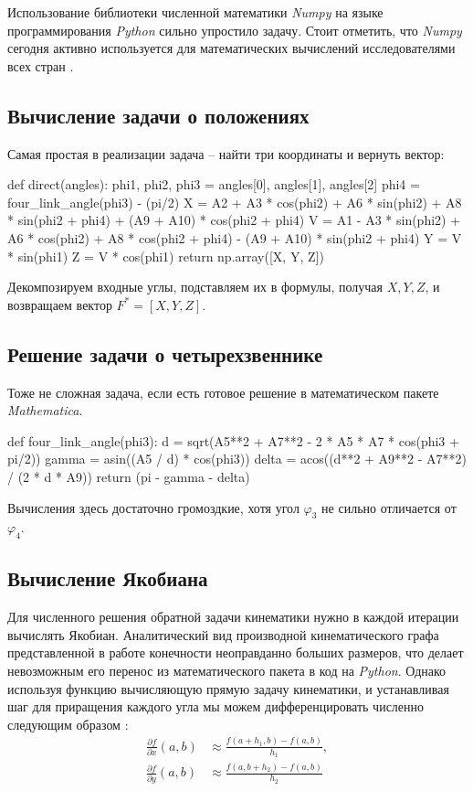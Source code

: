 Использование библиотеки численной математики \textit{Numpy} на языке программирования \textit{Python} сильно упростило задачу. Стоит отметить, что \textit{Numpy} сегодня активно используется для математических вычислений исследователями всех стран \cite{Numpy2020}.

\subsection{Вычисление задачи о положениях}

Самая простая в реализации задача -- найти три координаты и вернуть вектор:
\begin{python}
def direct(angles):
    phi1, phi2, phi3 = angles[0], angles[1], angles[2]
    phi4 = four_link_angle(phi3) - (pi/2)
    X = A2 + A3 * cos(phi2) + A6 * sin(phi2) + A8 * sin(phi2 + phi4) + (A9 + A10) * cos(phi2 + phi4)
    V = A1 - A3 * sin(phi2) + A6 * cos(phi2) + A8 * cos(phi2 + phi4) - (A9 + A10) * sin(phi2 + phi4)
    Y = V * sin(phi1)
    Z = V * cos(phi1)
    return np.array([X, Y, Z])
\end{python}

\noindent Декомпозируем входные углы, подставляем их в формулы, получая $ X, Y, Z $, и возвращаем вектор $ F^* =[ X, Y, Z ] $.

\subsection{Решение задачи о четырехзвеннике}
Тоже не сложная задача, если есть готовое решение в математическом пакете \textit{Mathematica}.
\begin{python}
def four_link_angle(phi3):
    d = sqrt(A5**2 + A7**2 - 2 * A5 * A7 * cos(phi3 + pi/2))
    gamma = asin((A5 / d) * cos(phi3))
    delta = acos((d**2 + A9**2 - A7**2) / (2 * d * A9))
    return (pi - gamma - delta)
\end{python}

\noindent Вычисления здесь достаточно громоздкие, хотя угол $ \varphi_3 $ не сильно отличается от $ \varphi_4 $.

\subsection{Вычисление Якобиана}
Для численного решения обратной задачи кинематики нужно в каждой итерации вычислять Якобиан. Аналитический вид производной кинематического графа представленной в работе конечности неоправданно больших размеров, что делает невозможным его перенос из математического пакета в код на \textit{Python}. Однако используя функцию вычисляющую прямую задачу кинематики, и устанавливая шаг для приращения каждого угла мы можем дифференцировать численно следующим образом \cite{Morken2010}:
\begin{align*}
    \frac{\partial f}{\partial x}(a, b) &\approx \frac{f(a+h_1, b) - f(a, b)}{h_1}, \\ 
    \frac{\partial f}{\partial y}(a, b) &\approx \frac{f(a, b+h_2) - f(a, b)}{h_2}
\end{align*}

